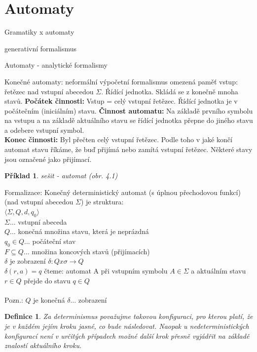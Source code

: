 \documentclass[10pt, a4paper, titlepage]{article}
\theoremstyle{note}
\newtheorem{definice}{\textbf{Definice}}
\newtheorem{priklad}{\textbf{Příklad}}
\begin{document}
\section{Automaty}
Gramatiky x automaty

generativní formalismus

Automaty - analytické formalismy

Konečné automaty: neformální
výpočetní formalismus 
omezená paměť
vstup: řetězec nad vstupní abecedou $\Sigma.$ Řídící jednotka. Skládá se z konečně mnoha stavů.
\textbf{Počátek činnosti:} Vstup = celý vstupní řetězec. Řídící jednotka je v počátečním (iniciálním) stavu.
\textbf{Činnost automatu:} Na základě prvního symbolu na vstupu a na základě aktuálního stavu se řídící jednotka 
přepne do jiného stavu a odebere vstupní symbol.\\
\textbf{Konec činnosti:} Byl přečten celý vstupní řetězec. Podle toho v jaké končí automat stavu říkáme, 
že buď přijímá nebo zamítá vstupní řetězec. Některé stavy jsou označené jako přijímací.

\begin{priklad}
sešit - automat (obr. 4.1)
\end{priklad}

Formalizace:
Konečný deterministický automat (s úplnou přechodovou funkcí) (nad vstupní abecedou $\Sigma$) je struktura: \\
$\langle \Sigma, Q, d, q_{0} \rangle$ \\
$\Sigma \ldots$ vstupní abeceda \\
$Q \ldots$ konečná množina stavu, která je neprázdná \\
$q_{0} \in Q \ldots$ počáteční stav \\
$F \subseteq Q \ldots$ množina koncových stavů (přijímacích) \\
$\delta$ je zobrazení $\delta: Q x \sigma \rightarrow Q$ \\
$\delta(r,a) = q$ čteme: automat A při vstupním symbolu $A \in \Sigma$ a aktuálním stavu $r \in Q$
 přejde do stavu $q \in Q$
\\ \\
Pozn.: $Q$ je konečná
$\delta \ldots$ zobrazení



\begin{definice}
Za \emph{determinismus} považujme takovou konfiguraci, pro kterou platí, že je v každém jejím kroku jasné, co bude následovat.
Naopak u \emph{nedeterministických} konfigurací není v určitých případech možné další krok přesně vyjádřit na základě znalostí aktuálního kroku.
\end{definice}
\end{document}
